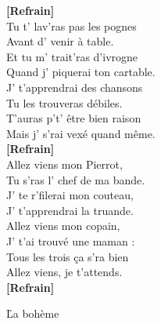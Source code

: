 \documentclass{novel}
\begin{document}
\begin{multicols}{2}
\textbf{[Refrain]} \\

Tu t' lav'ras pas les pognes \\
Avant d' venir à table. \\
Et tu m' trait'ras d'ivrogne \\
Quand j' piquerai ton cartable. \\
J' t'apprendrai des chansons \\
Tu les trouveras débiles. \\
T'auras p't' être bien raison \\
Mais j' s'rai vexé quand même. \\

\textbf{[Refrain]} \\

Allez viens mon Pierrot, \\
Tu s'ras l' chef de ma bande. \\
J' te r'filerai mon couteau, \\
J' t'apprendrai la truande. \\
Allez viens mon copain, \\
J' t'ai trouvé une maman : \\
Tous les trois ça s'ra bien \\
Allez viens, je t'attends. \\

\textbf{[Refrain]} \\

\end{multicols}

\newpage
\footnotesize

\h*{La bohème}
\end{document}
